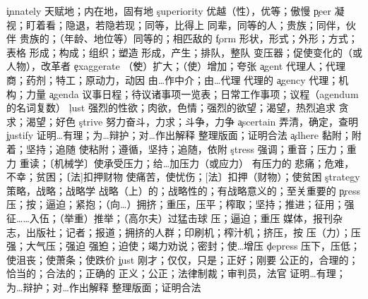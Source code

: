 \begin{multicols}{2}
\c{innately}  \ad 天赋地；内在地，固有地
\c{superiority}  \n 优越（性），优等；傲慢
\c{peer}  \vi 凝视；盯着看；隐退，若隐若现；同等，比得上 \n 同辈，同等的人；贵族；同伴，伙伴 \a 贵族的；（年龄、地位等）同等的；相匹敌的
\c{form}  \n 形状，形式；外形；方式；表格 \vt 形成；构成；组织；塑造 \vi 形成，产生；排队，整队
  \n 变压器；促使变化的（或人物），改革者
\c{exaggerate}  \v （使）扩大；（使）增加；夸张
\c{agent}  \n 代理人；代理商；药剂；特工；原动力，动因 \vt 由…作中介；由…代理 \a 代理的
\c{agency}  \n 代理；机构；力量
\c{agenda}  \n 议事日程；待议诸事项一览表；日常工作事项；议程（agendum 的名词复数）
\c{lust}  \n 强烈的性欲；肉欲，色情；强烈的欲望；渴望，热烈追求 \vi 贪求；渴望；好色 
\c{strive}  \vi 努力奋斗，力求；斗争，力争
\c{ascertain}  \vt 弄清，确定，查明 
\c{justify}  \vt 证明…有理；为…辩护；对…作出解释 \vi 整理版面；证明合法
\c{adhere}  \vi 黏附；附着；坚持；追随 \vt 使粘附；遵循，坚持；追随，依附 
\c{stress}  \n 强调；重音；压力；重力 \vt 重读；〔机械学〕使承受压力；给…加压力（或应力）
  \a 有压力的
  \n 悲痛；危难，不幸；贫困；〔法]扣押财物 \vt 使痛苦，使忧伤；[法〕扣押（财物）；使贫困
\c{strategy}  \n 策略，战略；战略学
  \a 战略（上）的；战略性的；有战略意义的；至关重要的
\c{press}  \vt 压；按；逼迫；紧抱；（向…）拥挤；重压，压平；榨取；坚持；推进；征用；强征……入伍；（举重）推举；（高尔夫）过猛击球 \vi 压；逼迫；重压 \n 媒体，报刊杂志，出版社；记者；报道；拥挤的人群；印刷机；榨汁机；挤压，按
  \n 压（力）；压强；大气压；强迫 \v 强迫；迫使；竭力劝说；密封；使…增压 
\c{depress}  \vt 压下，压低；使沮丧；使萧条；使跌价
\c{just}  \ad 刚才；仅仅，只是；正好；刚要 \a 公正的，合理的；恰当的；合法的；正确的
  \n 正义；公正；法律制裁；审判员，法官
  \vt 证明…有理；为…辩护；对…作出解释 \vi 整理版面；证明合法

\end{multicols}
